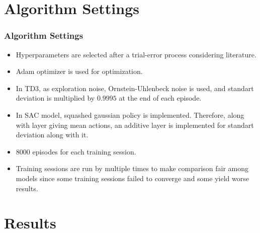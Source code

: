 \documentclass{beamer}
\begin{document}
\section{Algorithm Settings}
\begin{frame}
\frametitle{Algorithm Settings}
\begin{itemize}
	\item Hyperparameters are selected after a trial-error process considering literature. 
	\item Adam optimizer is used for optimization. 
	\item In TD3, as exploration noise, Ornstein-Uhlenbeck noise is used, and standart deviation is multiplied  by $0.9995$ at the end of each episode. 
	\item In SAC model, squashed gaussian policy is implemented. Therefore, along with layer giving mean actions, an additive layer is implemented for standart deviation along with it. 
	\item 8000 episodes for each training session. 
	\item Training sessions are run by multiple times to make comparison fair among models since some training sessions failed to converge and some yield worse results.
\end{itemize}
\end{frame}


\section{Results}
\end{document}
